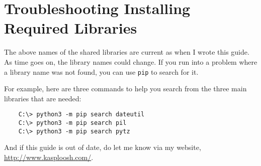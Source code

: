 \section{Troubleshooting Installing Required Libraries}

The above names of the shared libraries are current as when I wrote
this guide. As time goes on, the library names could change. If
you run into a problem where a library name was not found, you
can use \texttt{pip} to search for it.

For example, here are three commands to help you search from the
three main libraries that are needed:

\begin{verbatim}
    C:\> python3 -m pip search dateutil
    C:\> python3 -m pip search pil
    C:\> python3 -m pip search pytz
\end{verbatim}

And if this guide is out of date, do let me know via my website,
\url{http://www.kasploosh.com/}.
